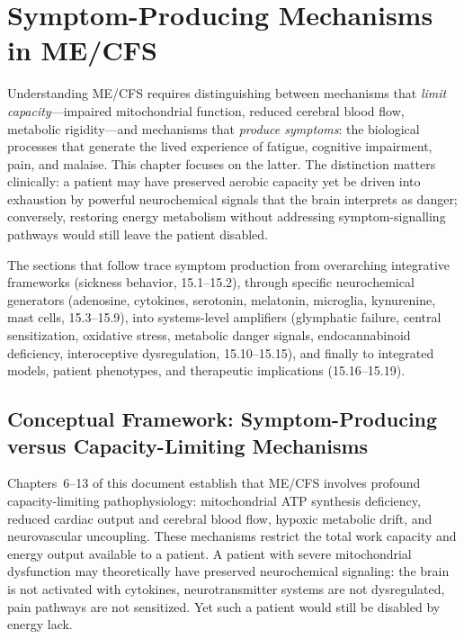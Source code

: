 \chapter{Symptom-Producing Mechanisms in ME/CFS}
\label{ch:symptom-mechanisms}

\vspace{1em}

Understanding ME/CFS requires distinguishing between mechanisms that \emph{limit capacity}---impaired mitochondrial function, reduced cerebral blood flow, metabolic rigidity---and mechanisms that \emph{produce symptoms}: the biological processes that generate the lived experience of fatigue, cognitive impairment, pain, and malaise. This chapter focuses on the latter. The distinction matters clinically: a patient may have preserved aerobic capacity yet be driven into exhaustion by powerful neurochemical signals that the brain interprets as danger; conversely, restoring energy metabolism without addressing symptom-signalling pathways would still leave the patient disabled.

The sections that follow trace symptom production from overarching integrative frameworks (sickness behavior, 15.1--15.2), through specific neurochemical generators (adenosine, cytokines, serotonin, melatonin, microglia, kynurenine, mast cells, 15.3--15.9), into systems-level amplifiers (glymphatic failure, central sensitization, oxidative stress, metabolic danger signals, endocannabinoid deficiency, interoceptive dysregulation, 15.10--15.15), and finally to integrated models, patient phenotypes, and therapeutic implications (15.16--15.19).


\section{Conceptual Framework: Symptom-Producing versus Capacity-Limiting Mechanisms}
\label{sec:ch15-conceptual-framework}

Chapters~6--13 of this document establish that ME/CFS involves profound capacity-limiting pathophysiology: mitochondrial ATP synthesis deficiency, reduced cardiac output and cerebral blood flow, hypoxic metabolic drift, and neurovascular uncoupling. These mechanisms restrict the total work capacity and energy output available to a patient. A patient with severe mitochondrial dysfunction may theoretically have preserved neurochemical signaling: the brain is not activated with cytokines, neurotransmitter systems are not dysregulated, pain pathways are not sensitized. Yet such a patient would still be disabled by energy lack.

